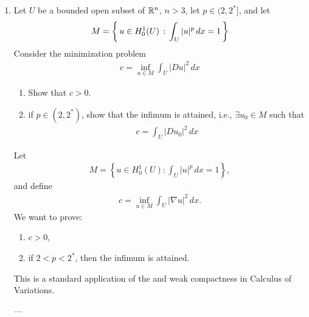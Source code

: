 \documentclass[12pt,a4paper]{report}
\begin{document}
\begin{enumerate}
\newpage
\item Let $U$ be a bounded open subset of $\mathbb{R}^n$, $n>3$, let $p \in (2,2^*]$, and let 
\begin{align*}
	M = \left \{\, u \in H_0^1(U)\,:\,\int_U |u|^p\,dx =1  \,\right \}
\end{align*}
Consider the minimization problem
\begin{align*}
	c = \inf_{u\in M} \int_U |Du|^2\,dx
\end{align*}
\begin{enumerate}
	\item Show that $c > 0$.
	\item if $p \in (2, 2^*)$, show that the infimum is attained, i.e., $\exists u_0\in M$ such that
\begin{align*}
	c = \int_U |Du_0|^2\,dx
\end{align*}
\end{enumerate}

\HLINE

Let
\begin{align*}
M=\left\{u\in H_0^1(U):\int_U |u|^p\,dx=1\right\},
\end{align*}
and define
\begin{align*}
c=\inf_{u\in M}\int_U |\nabla u|^2\,dx.
\end{align*}
We want to prove:
\begin{enumerate}
\item $c>0$,
\item if $2<p<2^*$, then the infimum is attained.
\end{enumerate}
This is a standard application of the  and weak compactness in Calculus of Variations.

---
\end{enumerate}
\end{document}
